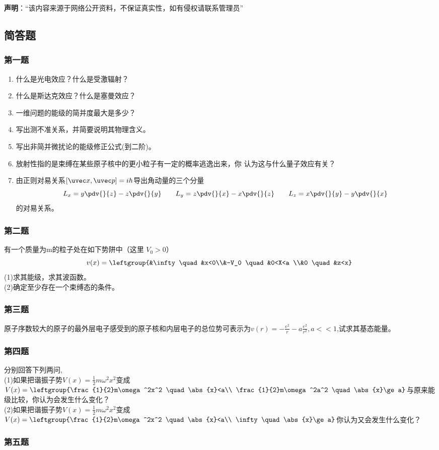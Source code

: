 

\textbf{声明}：“该内容来源于网络公开资料，不保证真实性，如有侵权请联系管理员”

\subsection{简答题}
\subsubsection{第一题}
\begin{enumerate}
\item 什么是光电效应？什么是受激辐射？
\item 什么是斯达克效应？什么是塞曼效应？
\item 一维问题的能级的简并度最大是多少？
\item 写出测不准关系，并简要说明其物理含义。
\item 写出非简并微扰论的能级修正公式(到二阶)。
\item 放射性指的是束缚在某些原子核中的更小粒子有一定的概率逃逸出来，你
认为这与什么量子效应有关？
\item 由正则对易关系$[\uvec x,\uvec p]=ih$导出角动量的三个分量
\begin{equation}
L_x=y\pdv{}{z}-z\pdv{}{y} \qquad L_y=z\pdv{}{x}-x\pdv{}{z} \qquad L_z=x\pdv{}{y}-y\pdv{}{x}~
\end{equation}
的对易关系。
\end{enumerate}
\subsubsection{第二题}
有一个质量为m的粒子处在如下势阱中（这里 $V_0>0$）
\begin{equation}
v(x)=\leftgroup{&\infty   \quad &x<0\\&-V_0 \quad &0<X<a \\&0 \quad &z<x}~
\end{equation}
(1)求其能级，求其波函数。\\
(2)确定至少存在一个束缚态的条件。
\subsubsection{第三题}
原子序数较大的原子的最外层电子感受到的原子核和内层电子的总位势可表示为$v(r)=-\frac{e^2}{r}-a\frac{e^2}{r^2},a<<1$,试求其基态能量。
\subsubsection{第四题}
分别回答下列两问,\\
(1)如果把谐振子势$V(x)=\frac{1}{2}m\omega^2x^2$变成$V(x)=\leftgroup{\frac{1}{2}m\omega^2x^2 \quad \abs{x}<a\\ \frac{1}{2}m\omega^2a^2 \quad \abs{x}\ge a}$与原来能级比较，你认为会发生什么变化？\\
(2)如果把谐振子势$V(x)=\frac{1}{2}m\omega^2x^2$变成$V(x)=\leftgroup{\frac{1}{2}m\omega^2x^2 \quad \abs{x}<a\\ \infty \quad \abs{x}\ge a}$你认为又会发生什么变化？
\subsubsection{第五题}

